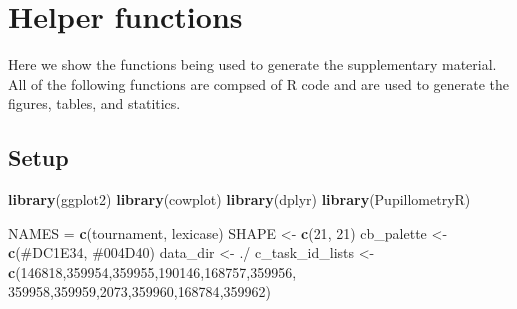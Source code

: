 \documentclass[
]{book}
\newenvironment{Shaded}{\begin{snugshade}}{\end{snugshade}}
\newcommand{\DecValTok}[1]{\textcolor[rgb]{0.00,0.00,0.81}{#1}}
\newcommand{\FunctionTok}[1]{\textcolor[rgb]{0.13,0.29,0.53}{\textbf{#1}}}
\newcommand{\NormalTok}[1]{#1}
\newcommand{\OtherTok}[1]{\textcolor[rgb]{0.56,0.35,0.01}{#1}}
\newcommand{\StringTok}[1]{\textcolor[rgb]{0.31,0.60,0.02}{#1}}
\begin{document}
\hypertarget{helper-functions}{%
\chapter{Helper functions}\label{helper-functions}}

Here we show the functions being used to generate the supplementary material.
All of the following functions are compsed of R code and are used to generate the figures, tables, and statitics.

\hypertarget{setup}{%
\section{Setup}\label{setup}}

\begin{Shaded}
\begin{Highlighting}[]
\FunctionTok{library}\NormalTok{(ggplot2)}
\FunctionTok{library}\NormalTok{(cowplot)}
\FunctionTok{library}\NormalTok{(dplyr)}
\FunctionTok{library}\NormalTok{(PupillometryR)}


\NormalTok{NAMES }\OtherTok{=} \FunctionTok{c}\NormalTok{(}\StringTok{\textquotesingle{}tournament\textquotesingle{}}\NormalTok{, }\StringTok{\textquotesingle{}lexicase\textquotesingle{}}\NormalTok{)}
\NormalTok{SHAPE }\OtherTok{\textless{}{-}} \FunctionTok{c}\NormalTok{(}\DecValTok{21}\NormalTok{, }\DecValTok{21}\NormalTok{)}
\NormalTok{cb\_palette }\OtherTok{\textless{}{-}} \FunctionTok{c}\NormalTok{(}\StringTok{\textquotesingle{}\#DC1E34\textquotesingle{}}\NormalTok{, }\StringTok{\textquotesingle{}\#004D40\textquotesingle{}}\NormalTok{)}
\NormalTok{data\_dir }\OtherTok{\textless{}{-}} \StringTok{\textquotesingle{}./\textquotesingle{}}
\NormalTok{c\_task\_id\_lists }\OtherTok{\textless{}{-}} \FunctionTok{c}\NormalTok{(}\DecValTok{146818}\NormalTok{,}\DecValTok{359954}\NormalTok{,}\DecValTok{359955}\NormalTok{,}\DecValTok{190146}\NormalTok{,}\DecValTok{168757}\NormalTok{,}\DecValTok{359956}\NormalTok{,}
                        \DecValTok{359958}\NormalTok{,}\DecValTok{359959}\NormalTok{,}\DecValTok{2073}\NormalTok{,}\DecValTok{359960}\NormalTok{,}\DecValTok{168784}\NormalTok{,}\DecValTok{359962}\NormalTok{)}


\end{Highlighting}
\end{Shaded}
\end{document}
